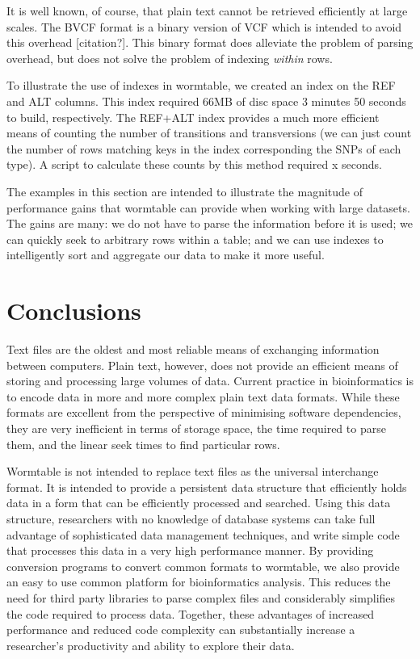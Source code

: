 \documentclass{bioinfo}
\begin{document}
It is well known, of course, that plain text cannot be retrieved 
efficiently at large scales. The BVCF format is a binary version 
of VCF which is intended to avoid this overhead [citation?]. 
This binary format does alleviate the problem of parsing overhead,
but does not solve the problem of indexing \emph{within} rows.

To illustrate the use of indexes in wormtable, we created an index 
on the REF and ALT columns. This index required 66MB of disc space 
3 minutes 50 seconds to build, respectively. The REF+ALT index provides a much more 
efficient means of counting the number of transitions and transversions 
(we can just count the number of rows matching keys in the index 
corresponding the SNPs of each type). A script to calculate these 
counts by this method required x seconds. 

The examples in this section are intended to illustrate the 
magnitude of performance gains that wormtable can provide 
when working with large datasets. The gains are many: we 
do not have to parse the information before it is used;
we can quickly seek to arbitrary rows within a table; and 
we can use indexes to intelligently sort and aggregate our
data to make it more useful.

\section{Conclusions}
Text files are the oldest and most reliable means of exchanging 
information between computers. Plain text, however, does not provide an efficient 
means of storing and processing large volumes of data. Current practice 
in bioinformatics is to encode data in more and more complex plain 
text data formats. While these formats are excellent from the perspective 
of minimising software dependencies, they are very inefficient in terms of 
storage space, the time required to parse them, and the linear
seek times to find particular rows.

Wormtable is not intended to replace text files as the universal 
interchange format. It is intended to provide a persistent data structure 
that efficiently holds data in a form that can be efficiently processed 
and searched. Using this data structure, researchers with no knowledge of 
database systems can take full advantage of sophisticated 
data management techniques, and write simple code that processes this 
data in a very high performance manner. 
By providing conversion programs to convert 
common formats to wormtable, we also provide an easy to 
use common platform for 
bioinformatics analysis. This reduces the need for third party libraries 
to parse complex files and considerably simplifies the code required 
to process data.
Together, these advantages of increased performance and reduced 
code complexity can substantially increase a researcher's 
productivity and ability to explore their data.
\end{document}

